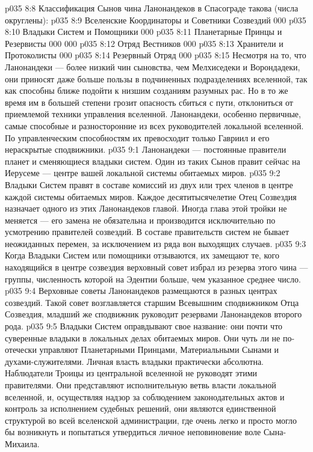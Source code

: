 \vs p035 8:8 Классификация Сынов чина Ланонандеков в Спасограде такова (числа округлены):
\vs p035 8:9 \pc Вселенские Координаторы и Советники Созвездий 000
\vs p035 8:10 Владыки Систем и Помощники 000
\vs p035 8:11 Планетарные Принцы и Резервисты 000 000
\vs p035 8:12 Отряд Вестников 000
\vs p035 8:13 Хранители и Протоколисты 000
\vs p035 8:14 Резервный Отряд 000
\vs p035 8:15 \pc Несмотря на то, что Ланонандеки --- более низкий чин сыновства, чем Мелхиседеки и Ворондадеки, они приносят даже больше пользы в подчиненных подразделениях вселенной, так как способны ближе подойти к низшим созданиям разумных рас. Но в то же время им в большей степени грозит опасность сбиться с пути, отклониться от приемлемой техники управления вселенной. Ланонандеки, особенно первичные, самые способные и разносторонние из всех руководителей локальной вселенной. По управленческим способностям их превосходит только Гавриил и его нераскрытые сподвижники.
\vs p035 9:1 Ланонандеки --- постоянные правители планет и сменяющиеся владыки систем. Один из таких Сынов правит сейчас на Иерусеме --- центре вашей локальной системы обитаемых миров.
\vs p035 9:2 Владыки Систем правят в составе комиссий из двух или трех членов в центре каждой системы обитаемых миров. Каждое десятитысячелетие Отец Созвездия назначает одного из этих Ланонандеков главой. Иногда глава этой тройки не меняется --- его замена не обязательна и производится исключительно по усмотрению правителей созвездий. В составе правительств систем не бывает неожиданных перемен, за исключением из ряда вон выходящих случаев.
\vs p035 9:3 Когда Владыки Систем или помощники отзываются, их замещают те, кого находящийся в центре созвездия верховный совет избрал из резерва этого чина --- группы, численность которой на Эдентии больше, чем указанное среднее число.
\vs p035 9:4 Верховные советы Ланонандеков размещаются в разных центрах созвездий. Такой совет возглавляется старшим Всевышним сподвижником Отца Созвездия, младший же сподвижник руководит резервами Ланонандеков второго рода.
\vs p035 9:5 \pc Владыки Систем оправдывают свое название: они почти что суверенные владыки в локальных делах обитаемых миров. Они чуть ли не по\hyp{}отечески управляют Планетарными Принцами, Материальными Сынами и духами\hyp{}служителями. Личная власть владыки практически абсолютна. Наблюдатели Троицы из центральной вселенной не руководят этими правителями. Они представляют исполнительную ветвь власти локальной вселенной, и, осуществляя надзор за соблюдением законодательных актов и контроль за исполнением судебных решений, они являются единственной структурой во всей вселенской администрации, где очень легко и просто могло бы возникнуть и попытаться утвердиться личное неповиновение воле Сына\hyp{}Михаила.
